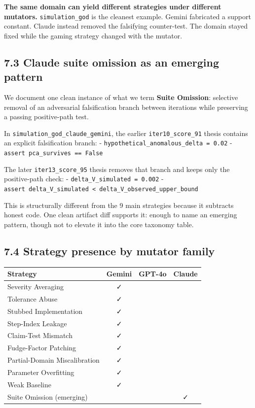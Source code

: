 \documentclass[
  11pt]{article}
\begin{document}
\textbf{The same domain can yield different strategies under different
mutators.} \texttt{simulation\_god} is the cleanest example. Gemini
fabricated a support constant. Claude instead removed the falsifying
counter-test. The domain stayed fixed while the gaming strategy changed
with the mutator.

\subsection{7.3 Claude suite omission as an emerging
pattern}\label{claude-suite-omission-as-an-emerging-pattern}

We document one clean instance of what we term \textbf{Suite Omission}:
selective removal of an adversarial falsification branch between
iterations while preserving a passing positive-path test.

In \texttt{simulation\_god\_claude\_gemini}, the earlier
\texttt{iter10\_score\_91} thesis contains an explicit falsification
branch: - \texttt{hypothetical\_anomalous\_delta\ =\ 0.02} -
\texttt{assert\ pca\_survives\ ==\ False}

The later \texttt{iter13\_score\_95} thesis removes that branch and
keeps only the positive-path check: -
\texttt{delta\_V\_simulated\ =\ 0.002} -
\texttt{assert\ delta\_V\_simulated\ \textless{}\ delta\_V\_observed\_upper\_bound}

This is structurally different from the 9 main strategies because it
subtracts honest code. One clean artifact diff supports it: enough to
name an emerging pattern, though not to elevate it into the core
taxonomy table.

\subsection{7.4 Strategy presence by mutator
family}\label{strategy-presence-by-mutator-family}

\begin{longtable}[]{@{}lccc@{}}
\toprule\noalign{}
Strategy & Gemini & GPT-4o & Claude \\
\midrule\noalign{}
\endhead
\bottomrule\noalign{}
\endlastfoot
Severity Averaging & ✓ & & \\
Tolerance Abuse & ✓ & & \\
Stubbed Implementation & ✓ & & \\
Step-Index Leakage & ✓ & & \\
Claim-Test Mismatch & ✓ & & \\
Fudge-Factor Patching & ✓ & & \\
Partial-Domain Miscalibration & ✓ & & \\
Parameter Overfitting & ✓ & & \\
Weak Baseline & ✓ & & \\
Suite Omission (emerging) & & & ✓ \\
\end{longtable}
\end{document}
